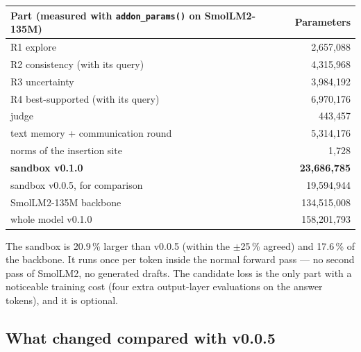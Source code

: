 \documentclass[a4paper,12pt,parskip=half,headsepline]{scrartcl}
\newcommand{\code}[1]{\texttt{\small #1}}
\begin{document}
\begin{center}
\begin{tabularx}{0.85\linewidth}{@{}Yr@{}}
\toprule
\textbf{Part (measured with \code{addon\_params()} on SmolLM2-135M)} & \textbf{Parameters}\\
\midrule
R1 explore & 2{,}657{,}088\\
R2 consistency (with its query) & 4{,}315{,}968\\
R3 uncertainty & 3{,}984{,}192\\
R4 best-supported (with its query) & 6{,}970{,}176\\
judge & 443{,}457\\
text memory + communication round & 5{,}314{,}176\\
norms of the insertion site & 1{,}728\\
\midrule
\textbf{sandbox v0.1.0} & \textbf{23{,}686{,}785}\\
sandbox v0.0.5, for comparison & 19{,}594{,}944\\
SmolLM2-135M backbone & 134{,}515{,}008\\
whole model v0.1.0 & 158{,}201{,}793\\
\bottomrule
\end{tabularx}
\end{center}

The sandbox is 20.9\,\% larger than v0.0.5 (within the $\pm$25\,\% agreed) and
17.6\,\% of the backbone. It runs once per token inside the normal forward pass ---
no second pass of SmolLM2, no generated drafts. The candidate loss is the only
part with a noticeable training cost (four extra output-layer evaluations on the
answer tokens), and it is optional.

\subsection{What changed compared with v0.0.5}
\end{document}

